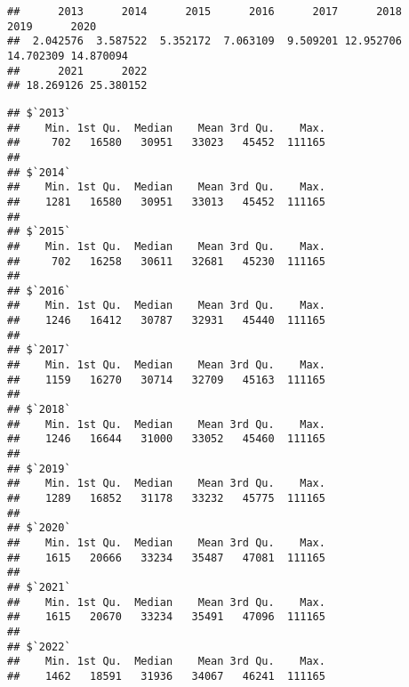 \documentclass[
]{article}
\newenvironment{Shaded}{\begin{snugshade}}{\end{snugshade}}
\newcommand{\AttributeTok}[1]{\textcolor[rgb]{0.13,0.29,0.53}{#1}}
\newcommand{\ConstantTok}[1]{\textcolor[rgb]{0.56,0.35,0.01}{#1}}
\newcommand{\FunctionTok}[1]{\textcolor[rgb]{0.13,0.29,0.53}{\textbf{#1}}}
\newcommand{\NormalTok}[1]{#1}
\newcommand{\SpecialCharTok}[1]{\textcolor[rgb]{0.81,0.36,0.00}{\textbf{#1}}}
\begin{document}
\begin{Shaded}
\end{Shaded}

\begin{verbatim}
##      2013      2014      2015      2016      2017      2018      2019      2020 
##  2.042576  3.587522  5.352172  7.063109  9.509201 12.952706 14.702309 14.870094 
##      2021      2022 
## 18.269126 25.380152
\end{verbatim}

\begin{Shaded}
\end{Shaded}

\begin{verbatim}
## $`2013`
##    Min. 1st Qu.  Median    Mean 3rd Qu.    Max. 
##     702   16580   30951   33023   45452  111165 
## 
## $`2014`
##    Min. 1st Qu.  Median    Mean 3rd Qu.    Max. 
##    1281   16580   30951   33013   45452  111165 
## 
## $`2015`
##    Min. 1st Qu.  Median    Mean 3rd Qu.    Max. 
##     702   16258   30611   32681   45230  111165 
## 
## $`2016`
##    Min. 1st Qu.  Median    Mean 3rd Qu.    Max. 
##    1246   16412   30787   32931   45440  111165 
## 
## $`2017`
##    Min. 1st Qu.  Median    Mean 3rd Qu.    Max. 
##    1159   16270   30714   32709   45163  111165 
## 
## $`2018`
##    Min. 1st Qu.  Median    Mean 3rd Qu.    Max. 
##    1246   16644   31000   33052   45460  111165 
## 
## $`2019`
##    Min. 1st Qu.  Median    Mean 3rd Qu.    Max. 
##    1289   16852   31178   33232   45775  111165 
## 
## $`2020`
##    Min. 1st Qu.  Median    Mean 3rd Qu.    Max. 
##    1615   20666   33234   35487   47081  111165 
## 
## $`2021`
##    Min. 1st Qu.  Median    Mean 3rd Qu.    Max. 
##    1615   20670   33234   35491   47096  111165 
## 
## $`2022`
##    Min. 1st Qu.  Median    Mean 3rd Qu.    Max. 
##    1462   18591   31936   34067   46241  111165
\end{verbatim}
\end{document}
